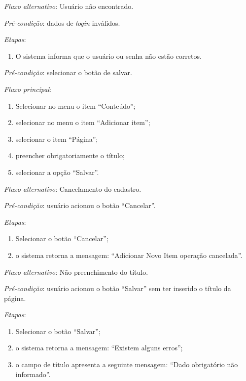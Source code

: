 \noindent \textit{Fluxo alternativo}: Usuário não encontrado.

\noindent \textit{Pré-condição}: dados de \textit{login} inválidos.

\noindent \textit{Etapas}:

\begin{enumerate}
    \item O sistema informa que o usuário ou senha não estão corretos.
\end{enumerate}


\vspace{0.7cm}

\noindent \textit{Pré-condição}: selecionar o botão de salvar.

\noindent \textit{Fluxo principal}:

\begin{enumerate}
    \item Selecionar no menu o item ``Conteúdo'';
    \item selecionar no menu o item ``Adicionar item'';
    \item selecionar o item ``Página'';
    \item preencher obrigatoriamente o título;
    \item selecionar a opção ``Salvar''.
\end{enumerate}

\noindent \textit{Fluxo alternativo}: Cancelamento do cadastro.

\noindent \textit{Pré-condição}: usuário acionou o botão ``Cancelar''.

\noindent \textit{Etapas}:

\begin{enumerate}
    \item Selecionar o botão ``Cancelar'';
    \item o sistema retorna a mensagem: ``Adicionar Novo Item operação cancelada''.
\end{enumerate}

\noindent \textit{Fluxo alternativo}: Não preenchimento do título.

\noindent \textit{Pré-condição}: usuário acionou o botão ``Salvar'' sem ter inserido o título da página.

\noindent \textit{Etapas}:

\begin{enumerate}
    \item Selecionar o botão ``Salvar'';
    \item o sistema retorna a mensagem: ``Existem alguns erros'';
    \item o campo de título apresenta a seguinte mensagem: ``Dado obrigatório não informado''.
\end{enumerate}



